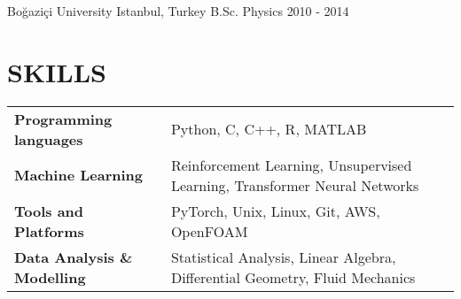 \documentclass[letterpaper,11pt]{article}
\begin{document}
\vspace{-4pt}

\resumeSubheading
{Boğaziçi University}
{Istanbul, Turkey}
{B.Sc. Physics}
{2010 - 2014}
\resumeItemListStart
{}
\resumeItemListEnd

\resumeSubHeadingListEnd
\vspace{-10pt}
\section{SKILLS}

\begin{multicols}{2}
  \begin{tabular}{ p{5.4cm} p{14.3cm}}
    \textbf{Programming languages}    & Python, C, C++, R, MATLAB \\
    \textbf{Machine Learning}         & Reinforcement Learning,
    Unsupervised Learning, Transformer Neural Networks \\
    \textbf{Tools and Platforms}         & PyTorch, Unix, Linux, Git,
    AWS, OpenFOAM \\
    \textbf{Data Analysis \& Modelling}         & Statistical
    Analysis, Linear Algebra, Differential Geometry, Fluid Mechanics \\
  \end{tabular}
\end{multicols}

%
\printbibliography[title = PUBLICATIONS]
\vspace{-8pt}
\end{document}
